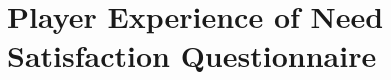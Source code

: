 \documentclass{uofsthesis-cs}
\begin{document}
\chapter{Player Experience of Need Satisfaction Questionnaire}            \label{app:q-pens}        \noindent{}
\end{document}
